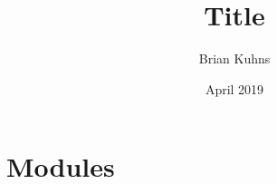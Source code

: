 \documentclass{article}
\title{Title}
\author{ Brian Kuhns }
\date{April 2019}
\begin{document}
\maketitle

\section{Modules}



\end{document}
